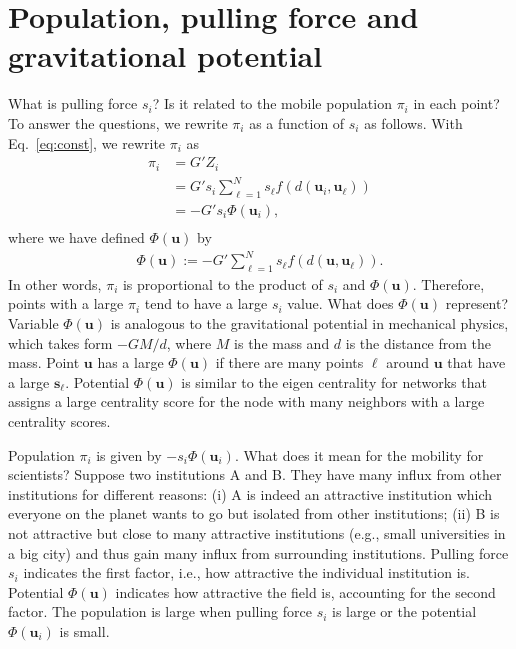 \documentclass[12pt]{article} %
\def\vec#1{{\bm #1}}
\begin{document}
\section{Population, pulling force and gravitational potential}

What is pulling force $s_i$? Is it related to the mobile population $\pi_i$ in each point?
To answer the questions, we rewrite $\pi_i$ as a function of $s_i$ as follows.
With Eq.~\eqref{eq:const}, we rewrite $\pi_i$ as 
\begin{align}
    \pi_i &= G' Z_i \nonumber \\
        &= G' s_i \sum_{\ell=1}^N s_\ell f\left(d\left(\vec{u}_i,\vec{u}_\ell\right)\right)\\
        &= -G' s_i \Phi(\vec{u}_i), \label{eq:flow_gravity_model_2} \\ %
\end{align}
where we have defined $\Phi(\vec{u})$ by 
\begin{align}
    \Phi(\vec{u}):=-G' \sum_{\ell=1}^N s_\ell f\left(d\left(\vec{u},\vec{u}_\ell\right)\right).
\end{align}
In other words, $\pi_i$ is proportional to the product of $s_i$ and $\Phi(\vec{u})$.
Therefore, points with a large $\pi_i$ tend to have a large $s_i$ value.
What does $\Phi(\vec{u})$ represent? 
Variable $\Phi(\vec{u})$ is analogous to the gravitational potential in mechanical physics, which takes form $-GM/d$, where $M$ is the mass and $d$ is the distance from the mass.
Point $\vec{u}$ has a large $\Phi(\vec{u})$ if there are many points $\ell$ around $\vec{u}$ that have a large $\vec{s}_\ell$.
Potential $\Phi(\vec{u})$ is similar to the eigen centrality for networks that assigns a large centrality score for the node with many neighbors with a large centrality scores.


Population $\pi_i$ is given by $-s_i\Phi(\vec{u}_i)$. What does it mean for the mobility for scientists?
Suppose two institutions A and B. They have many influx from other institutions for different reasons:
(i) A is indeed an attractive institution which everyone on the planet wants to go but isolated from other institutions;
(ii) B is not attractive but close to many attractive institutions (e.g., small universities in a big city) and thus gain many influx from surrounding institutions.
Pulling force $s_i$ indicates the first factor, i.e., how attractive the individual institution is. 
Potential $\Phi(\vec{u})$ indicates how attractive the field is, accounting for the second factor.
The population is large when pulling force $s_i$ is large or the potential $\Phi(\vec{u}_i)$ is small. 
\end{document}
